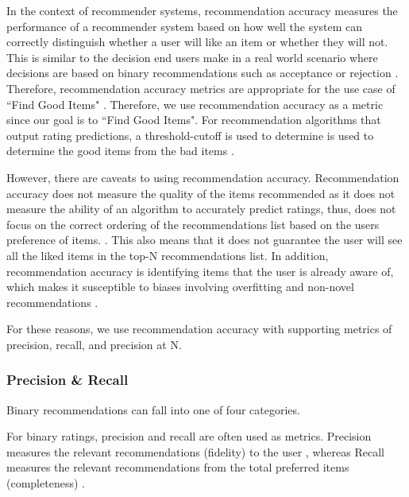 In the context of recommender systems, recommendation accuracy measures the performance of a recommender system based on how well the system can correctly distinguish whether a user will like an item or whether they will not. This is similar to the decision end users make in a real world scenario where decisions are based on binary recommendations such as acceptance or rejection \cite{zhang}. Therefore, recommendation accuracy metrics are appropriate for the use case of ``Find Good Items" \cite{evaluation}. Therefore, we use recommendation accuracy as a metric since our goal is to ``Find Good Items". For recommendation algorithms that output rating predictions, a threshold-cutoff is used to determine is used to determine the good items from the bad items \cite{zhang}.

However, there are caveats to using recommendation accuracy. Recommendation accuracy does not measure the quality of the items recommended as it does not measure the ability of an algorithm to accurately predict ratings, thus, does not focus on the correct ordering of the recommendations list based on the users preference of items. . This also means that it does not guarantee the user will see all the liked items in the top-N recommendations list. In addition, recommendation accuracy is identifying items that the user is already aware of, which makes it susceptible to biases involving overfitting and non-novel recommendations \cite{evaluation}. 

For these reasons, we use recommendation accuracy with supporting metrics of precision, recall, and precision at N. 

\subsubsection{Precision \& Recall}

Binary recommendations can fall into one of four categories. 

For binary ratings, precision and recall are often used as metrics. Precision measures the relevant recommendations (fidelity) to the user , whereas Recall measures the relevant recommendations from the total preferred items (completeness) . 

